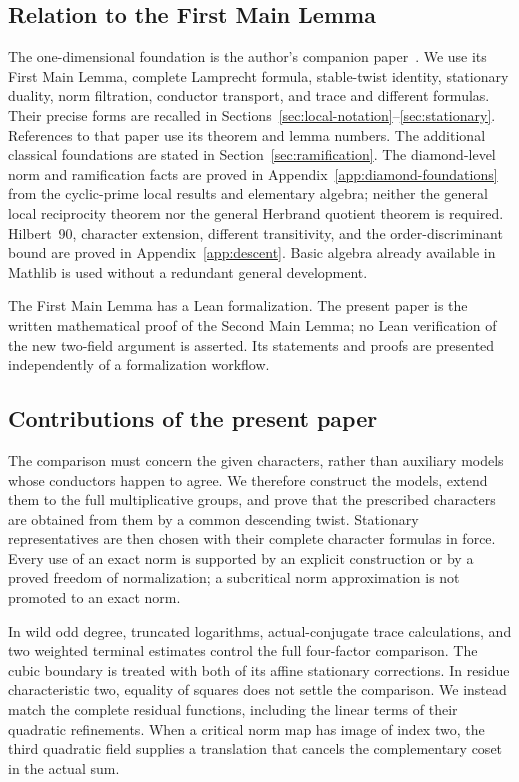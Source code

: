 \documentclass[11pt]{amsart}
\theoremstyle{definition}
\theoremstyle{remark}
\begin{document}
\subsection*{Relation to the First Main Lemma}
The one-dimensional foundation is the author's companion
paper~\cite{Ueda}. We use its First Main Lemma, complete Lamprecht
formula, stable-twist identity, stationary duality, norm filtration,
conductor transport, and trace and different formulas. Their precise
forms are recalled in Sections~\ref{sec:local-notation}--\ref{sec:stationary}.
References to that paper use its theorem and lemma numbers. The
additional classical foundations are stated in Section~\ref{sec:ramification}.
The diamond-level norm and ramification facts are proved in
Appendix~\ref{app:diamond-foundations} from the cyclic-prime local results
and elementary algebra; neither the general local reciprocity theorem
nor the general Herbrand quotient theorem is required. Hilbert~90,
character extension, different transitivity, and the order-discriminant
bound are proved in Appendix~\ref{app:descent}. Basic algebra already
available in Mathlib is used without a redundant general development.

The First Main Lemma has a Lean formalization. The present paper is the
written mathematical proof of the Second Main Lemma; no Lean
verification of the new two-field argument is asserted. Its statements
and proofs are presented independently of a formalization workflow.

\subsection*{Contributions of the present paper}
The comparison must concern the given characters, rather than auxiliary
models whose conductors happen to agree. We therefore construct the
models, extend them to the full multiplicative groups, and prove that
the prescribed characters are obtained from them by a common descending
twist. Stationary representatives are then chosen with their complete
character formulas in force. Every use of an exact norm is supported
by an explicit construction or by a proved freedom of normalization;
a subcritical norm approximation is not promoted to an exact norm.

In wild odd degree, truncated logarithms, actual-conjugate trace
calculations, and two weighted terminal estimates control the full
four-factor comparison. The cubic boundary is treated with both of its
affine stationary corrections. In residue characteristic two, equality
of squares does not settle the comparison. We instead match the
complete residual functions, including the linear terms of their
quadratic refinements. When a critical norm map has image of index two,
the third quadratic field supplies a translation that cancels the
complementary coset in the actual sum.
\end{document}
